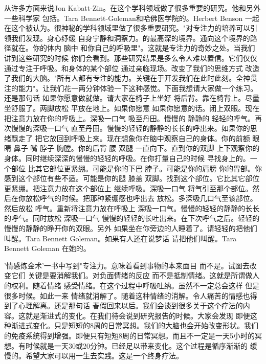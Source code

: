从许多方面来说Jon Kabatt-Zin。在这个学科领域做了很多重要的研究。他和另外一些科学家 包括。Tara Bennett-Goleman和哈佛医学院的。Herbert Benson 一起在这个被认为。很神秘的学科领域里做了很多重要研究。"对专注力的培养可以引领我们发现。身心纾缓 自身宁静和洞察力。的最高深的境界。通向这个境界的路径就在。你的体内 脑中 和你自己的呼吸里"。这就是专注力的奇妙之处。当我们讲到这些研究的时候 你们会看到。那些研究结果是多么令人难以置信。它们仅仅通过专注于呼吸。和身体的某个部位 通过亲临现场。改变了我们的思维方式 改造了我们的大脑。"所有人都有专注的能力。关键在于开发我们在此时此刻。全神贯注的能力"。让我们花一两分钟体验一下这种感觉。下面我想请大家做一个练习。还是那句话 如果你愿意做就做。请大家在椅子上坐好 将后背。靠在椅背上。尽量坐舒服了。两脚放松 平放在地上。如果你愿意 如果你愿意的话。闭上双眼。现在把注意力放在你的呼吸上。深吸一口气 吸至丹田。慢慢的 静静的 轻轻的呼气。再次慢慢的深吸一口气 直至丹田。慢慢的轻轻的静静的长长的呼出来。如果你的思绪飘走了 把它放回到呼吸上来。现在想象你在脑中观察自己的身体。你的前额 眼睛 鼻子 嘴 脖子 胸膛。你的后背 腰 双腿 一直向下。直到你的双脚 上下观察你的身体。同时继续深深的慢慢的轻轻的呼吸。在你打量自己的时候 寻找身上的。一个部位 比其它部位更紧绷。可能是你的下巴 脖子。可能是你的肩膀 你的胃部。你感到这个部位有些不适。可能是你的腿 膝盖 双脚。找到这个部位。它比其它部位更紧绷。把注意力放在这个部位上 继续呼吸。深吸一口气 将气引至那个部位。然后在你放松呼气的时候。把那种紧绷感也呼出去 放松。多深吸几口气至该部位。然后放松 呼气。重新将注意力放在呼吸上 深吸一口气。慢慢的轻轻的静静的长长的呼气。同时放松 深吸一口气 慢慢的轻轻的长吐出来。在下次呼气之后。轻轻的慢慢的静静的睁开你的双眼。另外 如果坐在你旁边的人睡着了。请轻轻的把他们叫醒。Tara Bennett Goleman。如果有人还在说梦话 请把他们叫醒。Tara Bennett Goleman 在她的。 

'情感炼金术'一书中写到"专注力。意味着看到事物的本来面目 而不是。试图去改变它们 关键是要消解我们。对负面情绪的反应 而不是抵制情绪。这就是所谓做人的权利。随着情绪 感受情绪。在这个过程中呼吸吐纳。虽然不一定总会这样 但是很多时候。如此一来 情绪就消解了。随着这种情绪的消解。令人痛苦的情感也得到了心理解离。还是那句话 春假回来以后。我们会谈到很多关于这个疗法的内容。这就是渐进式的变化。在我们待会说到研究报告的时候。大家会发现 即便这种渐进式变化。只是短短的8周的日常冥想。我们的大脑也会开始改变形状。我们的免疫系统得到增强。即便只有短短8周的日常冥想。而且不一定是一天5小时的冥想。有时候就是一天30或20分钟。已经足以带来变化。这个过程是循序渐渐的 缓慢的。希望大家可以用一生去实践。这是一个终身疗法。 

